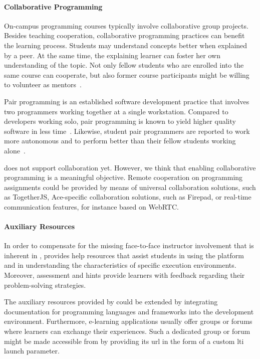 \paragraph{Collaborative Programming}

On-campus programming courses typically involve collaborative group projects. Besides teaching cooperation, collaborative programming practices can benefit the learning process. Students may understand concepts better when explained by a peer. At the same time, the explaining learner can foster her own understanding of the topic. Not only fellow students who are enrolled into the same course can cooperate, but also former course participants might be willing to volunteer as mentors~\cite{staubitz2014supporting}.

Pair programming is an established software development practice that involves two programmers working together at a single workstation. Compared to developers working solo, pair programming is known to yield higher quality software in less time~\cite{williams2000strengthening}. Likewise, student pair programmers are reported to work more autonomous and to perform better than their fellow students working alone~\cite{nagappan2003improving}.

\tool does not support collaboration yet. However, we think that enabling collaborative programming is a meaningful objective. Remote cooperation on programming assignments could be provided by means of universal collaboration solutions, such as TogetherJS, Ace-specific collaboration solutions, such as Firepad, or real-time communication features, for instance based on WebRTC.

\paragraph{Auxiliary Resources}

In order to compensate for the missing face-to-face instructor involvement that is inherent in \moocs, \tool provides help resources that assist students in using the platform and in understanding the characteristics of specific execution environments. Moreover, assessment and hints provide learners with feedback regarding their problem-solving strategies.

The auxiliary resources provided by \tool could be extended by integrating documentation for programming languages and frameworks into the development environment. Furthermore, e-learning applications usually offer groups or forums where learners can exchange their experiences. Such a dedicated group or forum might be made accessible from \tool by providing its \gls{url} in the form of a custom \gls{lti} launch parameter.

